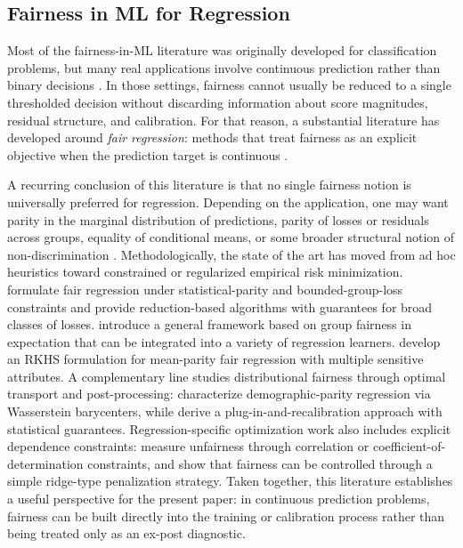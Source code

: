 \documentclass[12pt, draft]{article}
\theoremstyle{plain}
\theoremstyle{definition}
\newcommand{\1}{\mathbf{1}}
\begin{document}
\subsection{Fairness in ML for Regression}

Most of the fairness-in-ML literature was originally developed for classification problems, but many real applications involve continuous prediction rather than binary decisions \cite{CatonHaas2024,BarocasHardtNarayanan2023}. In those settings, fairness cannot usually be reduced to a single thresholded decision without discarding information about score magnitudes, residual structure, and calibration. For that reason, a substantial literature has developed around \emph{fair regression}: methods that treat fairness as an explicit objective when the prediction target is continuous \cite{AgarwalDudikWu2019,FitzsimonsEtAl2019,ChzhenEtAl2020Wasserstein,ChzhenEtAl2020Recalibration,WeiEtAl2023}.

A recurring conclusion of this literature is that no single fairness notion is universally preferred for regression. Depending on the application, one may want parity in the marginal distribution of predictions, parity of losses or residuals across groups, equality of conditional means, or some broader structural notion of non-discrimination \cite{AgarwalDudikWu2019,CatonHaas2024,BarocasHardtNarayanan2023}. Methodologically, the state of the art has moved from ad hoc heuristics toward constrained or regularized empirical risk minimization. \textcite{AgarwalDudikWu2019} formulate fair regression under statistical-parity and bounded-group-loss constraints and provide reduction-based algorithms with guarantees for broad classes of losses. \textcite{FitzsimonsEtAl2019} introduce a general framework based on group fairness in expectation that can be integrated into a variety of regression learners. \textcite{WeiEtAl2023} develop an RKHS formulation for mean-parity fair regression with multiple sensitive attributes. A complementary line studies distributional fairness through optimal transport and post-processing: \textcite{ChzhenEtAl2020Wasserstein} characterize demographic-parity regression via Wasserstein barycenters, while \textcite{ChzhenEtAl2020Recalibration} derive a plug-in-and-recalibration approach with statistical guarantees. Regression-specific optimization work also includes explicit dependence constraints: \textcite{KomiyamaEtAl2018} measure unfairness through correlation or coefficient-of-determination constraints, and \textcite{ScutariPaneroProissl2022} show that fairness can be controlled through a simple ridge-type penalization strategy. Taken together, this literature establishes a useful perspective for the present paper: in continuous prediction problems, fairness can be built directly into the training or calibration process rather than being treated only as an ex-post diagnostic.
\end{document}
